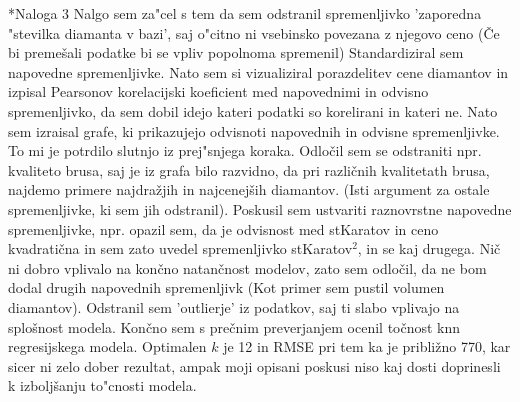 \documentclass[a4paper, 10pt]{article}
\begin{document}
\begin{subsection}*{Naloga 3}
    Nalgo sem za"cel s tem da sem odstranil spremenljivko 'zaporedna "stevilka diamanta v bazi', saj 
    o"citno ni vsebinsko povezana z njegovo ceno (Če bi premešali podatke bi se vpliv popolnoma spremenil)
    Standardiziral sem napovedne spremenljivke. Nato sem si vizualiziral porazdelitev cene diamantov in izpisal 
    Pearsonov korelacijski koeficient med napovednimi in odvisno spremenljivko, da sem dobil idejo kateri podatki 
    so korelirani in kateri ne.
    Nato sem izraisal grafe, ki prikazujejo odvisnoti napovednih in odvisne spremenljivke. To mi je potrdilo 
    slutnjo iz prej"snjega koraka. Odločil sem se odstraniti npr. kvaliteto brusa, saj je iz grafa bilo razvidno, 
    da pri različnih kvalitetath brusa, najdemo primere najdražjih in najcenejših diamantov. (Isti argument za ostale 
    spremenljivke, ki sem jih odstranil). Poskusil sem ustvariti raznovrstne napovedne spremenljivke, npr. opazil
    sem, da je odvisnost med stKaratov in ceno kvadratična in sem zato uvedel spremenljivko stKaratov$^2$, in se kaj drugega.
    Nič ni dobro vplivalo na končno natančnost modelov, zato sem odločil, da ne bom dodal drugih napovednih 
    spremenljivk (Kot primer sem pustil volumen diamantov).
    Odstranil sem 'outlierje' iz podatkov, saj ti slabo vplivajo na splošnost modela. Končno sem s 
    prečnim preverjanjem ocenil točnost knn regresijskega modela.
    Optimalen $k$ je 12 in RMSE pri tem ka je približno 770, kar sicer ni zelo dober rezultat, ampak moji opisani poskusi
    niso kaj dosti doprinesli k izboljšanju to"cnosti modela.
\end{subsection}
\end{document}
